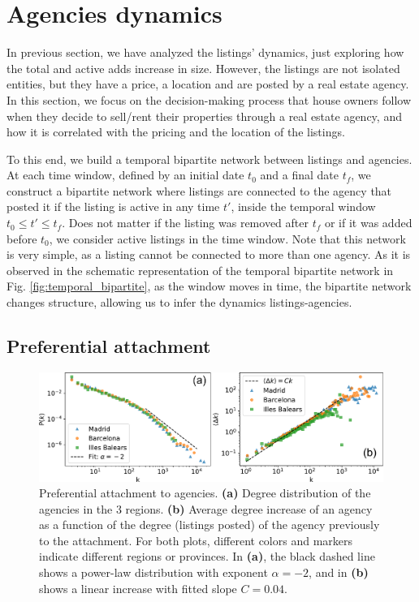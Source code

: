\section{Agencies dynamics}

In previous section, we have analyzed the listings' dynamics, just exploring how the total and active adds increase in size. However, the listings are not isolated entities, but they have a price, a location and are posted by a real estate agency. In this section, we focus on the decision-making process that house owners follow when they decide to sell/rent their properties through a real estate agency, and how it is correlated with the pricing and the location of the listings.

To this end, we build a temporal bipartite network between listings and agencies. At each time window, defined by an initial date $t_0$ and a final date $t_f$, we construct a bipartite network where listings are connected to the agency that posted it if the listing is active in any time $t'$, inside the temporal window $t_0 \leq t' \leq t_f$. Does not matter if the listing was removed after $t_f$ or if it was added before $t_0$, we consider active listings in the time window. Note that this network is very simple, as a listing cannot be connected to more than one agency. As it is observed in the schematic representation of the temporal bipartite network in Fig. \ref{fig:temporal_bipartite}, as the window moves in time, the bipartite network changes structure, allowing us to infer the dynamics listings-agencies.

\subsection{Preferential attachment}

\begin{figure}
    \centering
    \includegraphics[width =\textwidth]{Figs/Idealista_dynamics/panel_degree.pdf}
	\caption[Preferential attachment to agencies.]{\label{fig:panel_degree}Preferential attachment to agencies. \textbf{(a)} Degree distribution of the agencies in the 3 regions. \textbf{(b)} Average degree increase of an agency as a function of the degree (listings posted) of the agency previously to the attachment. For both plots, different colors and markers indicate different regions or provinces. In \textbf{(a)}, the black dashed line shows a power-law distribution with exponent $\alpha  =-2$, and in \textbf{(b)} shows a linear increase with fitted slope $C = 0.04$.}
\end{figure}

